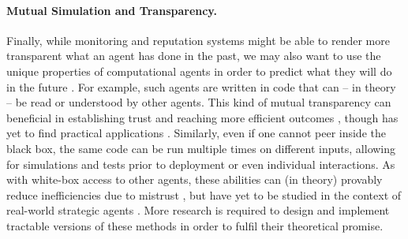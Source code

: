 \paragraph{Mutual Simulation and Transparency.}
Finally, while monitoring and reputation systems might be able to render more transparent what an agent has done in the past, we may also want to use the unique properties of computational agents in order to predict what they will do in the future \citep{Conitzer2023}.
For example, such agents are written in code that can -- in theory -- be read or understood by other agents.
This kind of mutual transparency can beneficial in establishing trust and reaching more efficient outcomes \citep{McAfee1984,Howard1988,tennenholtz2004program,halpern2018game,Oesterheld2018,Han2021}, though has yet to find practical applications \citep{Critch2022}.
Similarly, even if one cannot peer inside the black box, the same code can be run multiple times on different inputs, allowing for simulations and tests prior to deployment or even individual interactions.
As with white-box access to other agents, these abilities can (in theory) provably reduce inefficiencies due to mistrust \citep{Kovarik2023,Kovarik2024,Chen2024b}, but have yet to be studied in the context of real-world strategic agents \citep[though see, e.g.,][]{Griffin2024,Greenblatt2023}.
More research is required to design and implement tractable versions of these methods in order to fulfil their theoretical promise.

